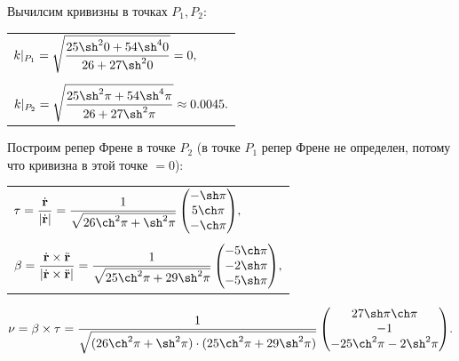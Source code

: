 \documentclass[12pt,a4paper]{article}
\newcommand{\boldVec}[1]{\mathbf #1}
\newcommand{\vectorProduct}[2]{\boldVec #1 \times \boldVec #2}
\begin{document}
    Вычилсим кривизны в точках $ P_1, P_2 \colon $
    \begin{table}[h!]
        \centering
        \begin{tabular}{l}
            $
                k|_{P_1} = \sqrt{\dfrac{25 \sh^2 0 + 54 \sh^4 0}{26 + 27 \sh^2 0}} = 0,
            $
            \\ \\
            $
                k|_{P_2} = \sqrt{\dfrac{25 \sh^2 \pi + 54 \sh^4 \pi}{26 + 27 \sh^2 \pi}} \approx 0.0045.
            $
        \end{tabular}
    \end{table}


    Построим репер Френе в точке $ P_2 $ (в точке $ P_1$ репер Френе не определен, потому что кривизна в этой точке $ = 0$):
    \begin{table}[h!]
        \centering
        \begin{tabular}{l}
            $
                \boldVec{\tau} = \dfrac{\dot{\boldVec{r}}}{|\dot{\boldVec{r}}|} = \dfrac{1}{\sqrt{26 \ch^2 \pi + \sh^2 \pi}} 
                    \begin{pmatrix}
                        -\sh \pi 
                        \\
                        5 \ch \pi
                        \\
                        -\ch \pi
                    \end{pmatrix}\!,
            $
            \\ \\ 
            $
                \boldVec{\beta} = \dfrac{\dot{\boldVec r} \times \ddot{\boldVec r}}{ | \dot{\boldVec r} \times \ddot{\boldVec r} |} = \dfrac{1}{\sqrt{25\ch^2 \pi + 29\sh^2 \pi}} 
                    \begin{pmatrix}
                        -5\ch \pi 
                        \\
                        -2\sh \pi
                        \\
                        -5\sh \pi 
                    \end{pmatrix}\!,
            $
        \end{tabular}
    \end{table}
    \[
        \boldVec{\nu} = \vectorProduct{\beta}{\tau} = \dfrac{1}{\sqrt{(26 \ch^2 \pi + \sh^2 \pi) \cdot (25\ch^2 \pi + 29\sh^2 \pi)}}
            \begin{pmatrix}
                27 \sh \pi \ch \pi
                \\
                -1
                \\
                -25 \ch^2 \pi - 2\sh^2 \pi
            \end{pmatrix}\!.
    \]
\end{document}
